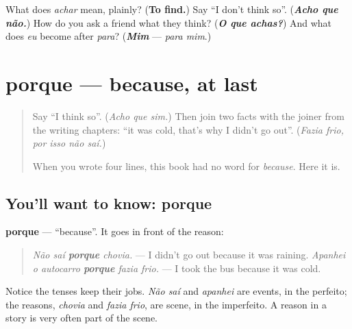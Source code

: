 \begin{tcolorbox}[breakable,colback=teal!4,colframe=teal!35!black,title={Before you move on}]
What does \emph{achar} mean, plainly? (\textbf{To find.}) Say \textquotedblleft{}I don't think so\textquotedblright{}. (\emph{\textbf{Acho que não.}}) How do you ask a friend what they think? (\emph{\textbf{O que achas?}}) And what does \emph{eu} become after \emph{para}? (\emph{\textbf{Mim}} — \emph{para mim}.)
\end{tcolorbox}
\section[porque]{porque — because, at last}

\label{lesson:PT-C261-porque}



\begin{quote}
Say \textquotedblleft{}I think so\textquotedblright{}. (\emph{Acho que sim.}) Then join two facts with the joiner from the writing chapters: \textquotedblleft{}it was cold, that's why I didn't go out\textquotedblright{}. (\emph{Fazia frio, por isso não saí.})

When you wrote four lines, this book had no word for \emph{because}. Here it is.
\end{quote}

\subsection*{You'll want to know: porque}
\textbf{porque} — \textquotedblleft{}because\textquotedblright{}. It goes in front of the reason:

\begin{quote}
\emph{Não saí \textbf{porque} chovia.} — I didn't go out because it was raining. \emph{Apanhei o autocarro \textbf{porque} fazia frio.} — I took the bus because it was cold.
\end{quote}

Notice the tenses keep their jobs. \emph{Não saí} and \emph{apanhei} are events, in the perfeito; the reasons, \emph{chovia} and \emph{fazia frio}, are scene, in the imperfeito. A reason in a story is very often part of the scene.

